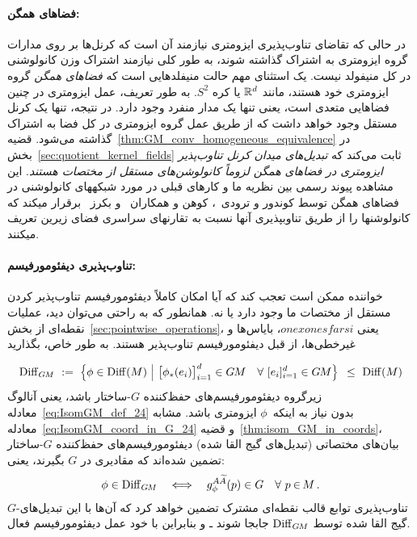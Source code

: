 \paragraph{فضاهای همگن:}
در حالی که تقاضای تناوب‌پذیری ایزومتری نیازمند آن است که کرنل‌ها بر روی مدارات گروه ایزومتری به اشتراک گذاشته شوند، به طور کلی نیازمند اشتراک وزن کانولوشنی در کل منیفولد نیست.
یک استثنای مهم حالت منیفلدهایی است که \emph{فضاهای همگن} گروه ایزومتری خود هستند، مانند $\mathbb{R}^d$ یا کره $S^2$.
به طور تعریف، عمل ایزومتری در چنین فضاهایی متعدی است، یعنی تنها یک مدار منفرد وجود دارد.
در نتیجه، تنها یک کرنل مستقل وجود خواهد داشت که از طریق عمل گروه ایزومتری در کل فضا به اشتراک گذاشته می‌شود.
قضیه~\ref{thm:GM_conv_homogeneous_equivalence} در بخش~\ref{sec:quotient_kernel_fields} ثابت می‌کند که \emph{تبدیل‌های میدان کرنل تناوب‌پذیر ایزومتری در فضاهای همگن لزوماً کانولوشن‌های مستقل از مختصات هستند}.
این مشاهده پیوند رسمی بین نظریه ما و کارهای قبلی در مورد شبکههای کانولوشنی در فضاهای همگن
توسط کوندور و ترودی~\cite{Kondor2018-GENERAL}، کوهن و همکاران~\cite{Cohen2019-generaltheory} و بکرز~\cite{bekkers2020bspline} برقرار میکند
که کانولوشنها را از طریق تناوبپذیری آنها نسبت به تقارنهای سراسری فضای زیرین تعریف میکنند.






\paragraph{تناوب‌پذیری دیفئومورفیسم:}
خواننده ممکن است تعجب کند که آیا امکان کاملاً دیفئومورفیسم تناوب‌پذیر کردن  مستقل از مختصات ما وجود دارد یا نه.
همانطور که به راحتی می‌توان دید، عملیات نقطه‌ای از بخش~\ref{sec:pointwise_operations}، یعنی $onexonesfarsi$، بایاس‌ها و غیرخطی‌ها، از قبل دیفئومورفیسم تناوب‌پذیر هستند.
به طور خاص، بگذارید

\begin{align}\label{eq:DiffGM_def_part1}
	\DiffGM\ :=\ \pig\{ \phi \in \Diff(M) \ \pig|\ 
	\big[\phi_*(e_i)\big]_{i=1}^d \in \GM \quad \forall\ [e_i]_{i=1}^d \in \GM \pig\} \,\ \leq\ \Diff(M)
\end{align}
زیرگروه دیفئومورفیسم‌های حفظ‌کننده $G$-ساختار باشد، یعنی آنالوگ معادله~\eqref{eq:IsomGM_def_24} بدون نیاز به اینکه~$\phi$ ایزومتری باشد.
مشابه معادله~\eqref{eq:IsomGM_coord_in_G_24} و قضیه~\ref{thm:isom_GM_in_coords}، بیان‌های مختصاتی (تبدیل‌های گیج القا شده) دیفئومورفیسم‌های حفظ‌کننده $G$-ساختار تضمین شده‌اند که مقادیری در $G$ بگیرند، یعنی:
\begin{align}
	\phi \in \operatorname{Diff}_{G\mkern-1.4muM} \quad \Longleftrightarrow \quad g_\phi^{A\widetilde{A}}(p) \in G\ \ \ \forall\ p \mkern-1mu\in\mkern-2mu M \,.
\end{align}
$G$-تناوب‌پذیری توابع قالب نقطه‌ای مشترک تضمین خواهد کرد که آن‌ها با این تبدیل‌های گیج القا شده توسط $\operatorname{Diff}_{G\mkern-1.4muM}$ جابجا شوند ـ و بنابراین با خود عمل دیفئومورفیسم فعال.


